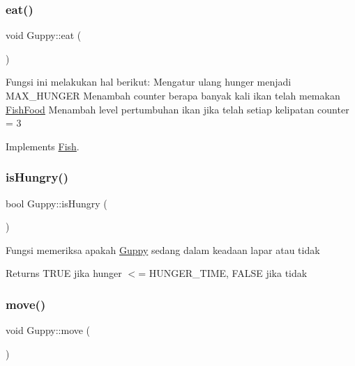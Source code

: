 \mbox{\label{class_guppy_afe934262a0988e4ad041f4ed3a1a7e02}} 
\subsubsection{\texorpdfstring{eat()}{eat()}}
{\footnotesize\ttfamily void Guppy\+::eat (\begin{DoxyParamCaption}{ }\end{DoxyParamCaption})\hspace{0.3cm}{\ttfamily [virtual]}}

Fungsi ini melakukan hal berikut\+: Mengatur ulang hunger menjadi M\+A\+X\+\_\+\+H\+U\+N\+G\+ER Menambah counter berapa banyak kali ikan telah memakan \mbox{\hyperlink{class_fish_food}{Fish\+Food}} Menambah level pertumbuhan ikan jika telah setiap kelipatan counter = 3 

Implements \mbox{\hyperlink{class_fish_af209980bd39b8de9b4bb38b7ad4edd04}{Fish}}.

\mbox{\label{class_guppy_a47886449d5153f51183cf4e6c46c8548}} 
\subsubsection{\texorpdfstring{is\+Hungry()}{isHungry()}}
{\footnotesize\ttfamily bool Guppy\+::is\+Hungry (\begin{DoxyParamCaption}{ }\end{DoxyParamCaption})}

Fungsi memeriksa apakah \mbox{\hyperlink{class_guppy}{Guppy}} sedang dalam keadaan lapar atau tidak \begin{DoxyReturn}{Returns}
T\+R\+UE jika hunger $<$= H\+U\+N\+G\+E\+R\+\_\+\+T\+I\+ME, F\+A\+L\+SE jika tidak 
\end{DoxyReturn}
\mbox{\label{class_guppy_ae6002948d74b3741bed34a7311be4377}} 
\subsubsection{\texorpdfstring{move()}{move()}}
{\footnotesize\ttfamily void Guppy\+::move (\begin{DoxyParamCaption}{ }\end{DoxyParamCaption})\hspace{0.3cm}{\ttfamily [virtual]}}

